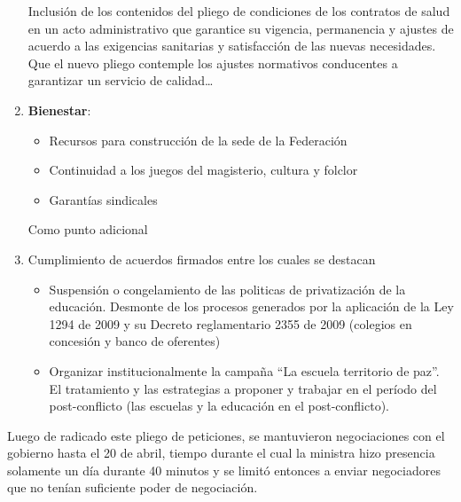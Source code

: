 \documentclass[letterpaper,11pt,twoside]{article}
\begin{document}
\begin{multicols}{2}
\begin{enumerate}
Inclusión de los contenidos del pliego de condiciones de los
contratos de salud en un acto administrativo que garantice su
vigencia, permanencia y ajustes de acuerdo a las exigencias sanitarias y satisfacción de las nuevas necesidades. Que el nuevo pliego contemple los ajustes normativos conducentes a garantizar un servicio de calidad\ldots
\item \textbf{Bienestar}:
\begin{itemize}
\item Recursos para construcción de la sede de la Federación
\item Continuidad a los juegos del magisterio, cultura y folclor
\item Garantías sindicales
\end{itemize}
Como punto adicional
\item Cumplimiento de acuerdos firmados entre los cuales se destacan
\begin{itemize}
\item Suspensión o congelamiento de las politicas de privatización de la educación. Desmonte de los procesos
generados por la aplicación de la Ley 1294 de 2009 y su Decreto reglamentario 2355 de 2009 (colegios en concesión y banco de oferentes)
\item Organizar institucionalmente la campaña “La escuela territorio de paz”. El tratamiento y las estrategias a
proponer y trabajar en el período del post-conflicto (las escuelas y la educación en el post-conflicto).
\end{itemize}
 \end{enumerate}
 Luego de radicado este pliego de peticiones, se mantuvieron negociaciones con el gobierno hasta el 20 de abril, tiempo durante el cual la ministra hizo presencia solamente un día durante 40 minutos y se limitó entonces a enviar negociadores que no tenían suficiente poder de negociación.

\end{multicols}
\end{document}
